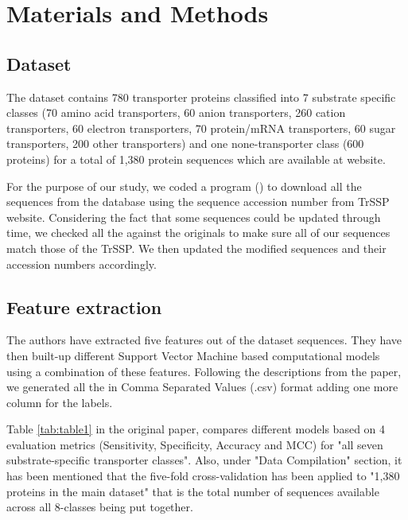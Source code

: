 \section{Materials and Methods}

    \subsection{Dataset}   

    The dataset contains 780 transporter proteins classified into 7 substrate specific classes (70 amino acid transporters, 
    60 anion transporters, 260 cation transporters, 60 electron transporters, 70 protein/mRNA transporters, 60 sugar 
    transporters, 200 other transporters) and one none-transporter class (600 proteins) for a total of 1,380 protein 
    sequences which are available at   website.
    
    For the purpose of our study, we coded a program () to download all the sequences from the 
     database using the sequence accession number from TrSSP website. 
    Considering the fact that some sequences could be updated through time, we checked all the  
    against the originals to make sure all of our sequences match those of the TrSSP. We then updated the 
    modified sequences and their accession numbers accordingly.

    \subsection{Feature extraction}

    The authors \cite{mishra2014prediction} have extracted five features out of the dataset sequences. They have then built-up different Support Vector Machine based 
    computational models using a combination of these features. Following the descriptions from the paper, we generated all the 
     in Comma Separated Values (.csv) format adding one more column for the labels.

    Table \ref{tab:table1} in the original paper, compares different models based on 4 evaluation metrics (Sensitivity, Specificity, Accuracy and MCC) for 
    "all seven substrate-specific transporter classes". Also, under "Data Compilation" section, it has been mentioned that the five-fold 
    cross-validation has been applied to "1,380 proteins in the main dataset" that is the total number of sequences available across 
    all 8-classes being put together.

